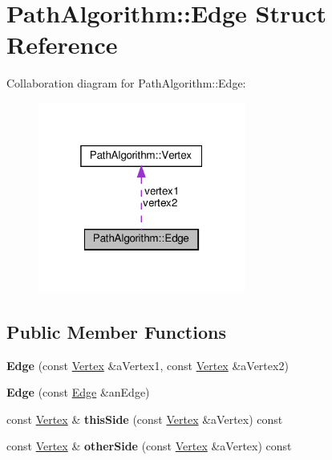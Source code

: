 \hypertarget{struct_path_algorithm_1_1_edge}{}\section{Path\+Algorithm\+:\+:Edge Struct Reference}
\label{struct_path_algorithm_1_1_edge}


Collaboration diagram for Path\+Algorithm\+:\+:Edge\+:
\nopagebreak
\begin{figure}[H]
\begin{center}
\leavevmode
\includegraphics[width=193pt]{struct_path_algorithm_1_1_edge__coll__graph}
\end{center}
\end{figure}
\subsection*{Public Member Functions}
\begin{DoxyCompactItemize}
\item 
{\bfseries Edge} (const \hyperlink{struct_path_algorithm_1_1_vertex}{Vertex} \&a\+Vertex1, const \hyperlink{struct_path_algorithm_1_1_vertex}{Vertex} \&a\+Vertex2)\hypertarget{struct_path_algorithm_1_1_edge_a4378105bc5d8b8b2fd147cb8b5a62662}{}\label{struct_path_algorithm_1_1_edge_a4378105bc5d8b8b2fd147cb8b5a62662}

\item 
{\bfseries Edge} (const \hyperlink{struct_path_algorithm_1_1_edge}{Edge} \&an\+Edge)\hypertarget{struct_path_algorithm_1_1_edge_a2a1cfa63c51fac6e9c7385ab6b0b0b0c}{}\label{struct_path_algorithm_1_1_edge_a2a1cfa63c51fac6e9c7385ab6b0b0b0c}

\item 
const \hyperlink{struct_path_algorithm_1_1_vertex}{Vertex} \& {\bfseries this\+Side} (const \hyperlink{struct_path_algorithm_1_1_vertex}{Vertex} \&a\+Vertex) const \hypertarget{struct_path_algorithm_1_1_edge_a0a987c8705e5e41f890fb4f222243af8}{}\label{struct_path_algorithm_1_1_edge_a0a987c8705e5e41f890fb4f222243af8}

\item 
const \hyperlink{struct_path_algorithm_1_1_vertex}{Vertex} \& {\bfseries other\+Side} (const \hyperlink{struct_path_algorithm_1_1_vertex}{Vertex} \&a\+Vertex) const \hypertarget{struct_path_algorithm_1_1_edge_a204de7bc294af2cd5df73c29b2587345}{}\label{struct_path_algorithm_1_1_edge_a204de7bc294af2cd5df73c29b2587345}

\end{DoxyCompactItemize}
